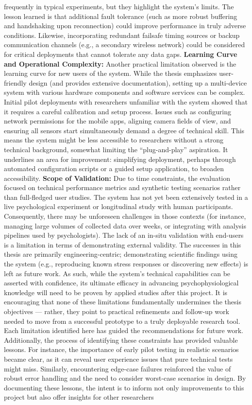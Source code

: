 \documentclass[11pt,a4paper]{report}
\begin{document}
{frequently in typical experiments, but they highlight the system’s limits. The lesson learned is that additional fault tolerance (such as more robust buffering and handshaking upon reconnection) could improve performance in truly adverse conditions. Likewise, incorporating redundant failsafe timing sources or backup communication channels (e.g., a secondary wireless network) could be considered for critical deployments that cannot tolerate any data gaps. \textbf{Learning Curve and Operational Complexity:} Another practical limitation observed is the learning curve for new users of the system. While the thesis emphasizes user-friendly design (and provides extensive documentation), setting up a multi-device system with various hardware components and software services can be complex. Initial pilot deployments with researchers unfamiliar with the system showed that it requires a careful calibration and setup process. Issues such as configuring network permissions for the mobile apps, aligning camera fields of view, and ensuring all sensors start simultaneously demand a degree of technical skill. This means the system might be less accessible to researchers without a strong technical background, somewhat limiting the “plug-and-play” aspiration. It underlines an area for improvement: simplifying deployment, perhaps through automated configuration scripts or a guided setup application, to broaden accessibility. \textbf{Scope of Validation:} Due to time constraints, the evaluation focused on technical performance metrics and synthetic testing scenarios rather than full-fledged user studies. The system has not yet been extensively tested in a live psychological experiment or longitudinal study with human participants. Consequently, there may be unforeseen challenges in those contexts (for instance, managing large volumes of collected data over weeks, or integrating with analysis pipelines used by psychologists). The lack of an in-situ validation with end-users is a limitation in terms of demonstrating external validity. The successes in this thesis are primarily engineering-centric; demonstrating scientific findings using the system (e.g., reproducing known stress responses or discovering new effects) is left as future work. As such, while the system’s technical capabilities can be asserted with confidence, its ultimate efficacy in advancing psychophysiological knowledge will need to be proven by applied studies after this project. It is encouraging that none of these limitations fundamentally undermines the thesis objectives — rather, they point to practical refinements and follow-up work needed to move from a successful prototype to a truly deployable research tool. Each limitation identified here has guided the recommendations for future work. Additionally, the process of identifying these constraints has provided valuable lessons. For instance, the importance of early pilot testing in realistic scenarios became clear, as it can reveal user experience issues that pure technical tests might miss. Similarly, encountering edge-case failures reinforced the value of robust error handling and the need to consider worst-case scenarios in design. By documenting these lessons, the intent is to inform not only improvements to this project but also offer insights for other researchers }
\end{document}
